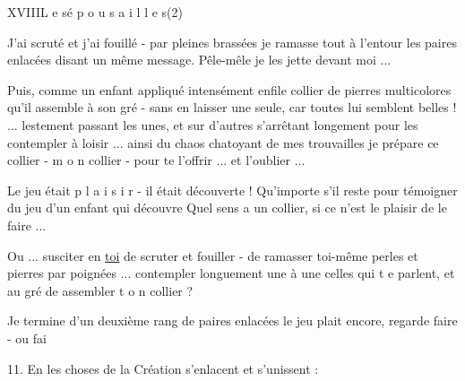 
XVIII\qquad L e s\quad é p o u s a i l l e s\qquad (2)

J'ai scruté et j'ai fouillé - par pleines brassées je ramasse tout à l'entour les paires enlacées disant un même message. Pêle-mêle je les jette devant moi ...

Puis, comme un enfant appliqué intensément enfile collier de pierres multicolores qu'il assemble à son gré - sans en laisser une seule, car toutes lui semblent belles ! ... lestement passant les unes, et sur d'autres s'arrêtant longement pour les contempler à loisir ... ainsi du chaos chatoyant de mes trouvailles je prépare ce collier - m o n collier - pour te l'offrir ... et  l'oublier ...

Le jeu était p l a i s i r - il était découverte ! Qu'importe s'il reste  pour témoigner du jeu  d'un enfant qui découvre \unsure{!} Quel sens a un collier, si ce n'est le plaisir de le faire ...

Ou ... susciter en \uline{toi}  de scruter et fouiller - de ramasser toi-même perles et pierres par poignées ... contempler longuement une à une celles qui t e parlent, et au gré de    assembler t o n collier ?



Je termine d'un deuxième rang de paires enlacées   le jeu  plait encore,  regarde faire - ou  fai

11. En les choses de la Création s'enlacent et s'unissent :

